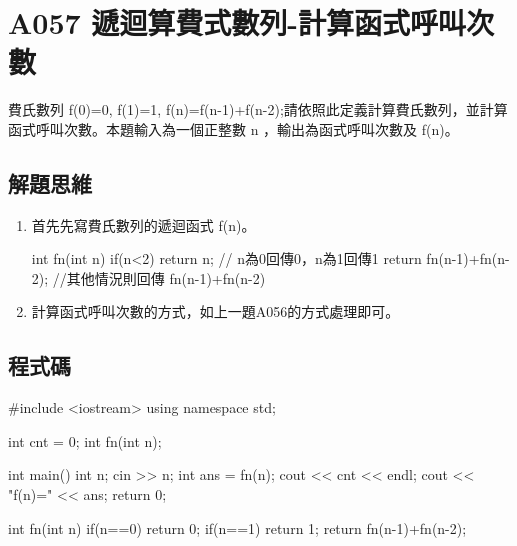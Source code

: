 \section{A057 遞迴算費式數列-計算函式呼叫次數}
費氏數列 f(0)=0, f(1)=1, f(n)=f(n-1)+f(n-2);請依照此定義計算費氏數列，並計算函式呼叫次數。本題輸入為一個正整數 n ，輸出為函式呼叫次數及 f(n)。

\subsection{解題思維}

\begin{enumerate}
	\item
	首先先寫費氏數列的遞迴函式 f(n)。
	\begin{inside}
	int fn(int n) {
		if(n<2) return n; // n為0回傳0，n為1回傳1
		return fn(n-1)+fn(n-2); //其他情況則回傳 fn(n-1)+fn(n-2)
	}	
	\end{inside}
	\item
	計算函式呼叫次數的方式，如上一題A056的方式處理即可。
\end{enumerate} 

\subsection{程式碼}
\begin{cppcode}
	#include <iostream>
	using namespace std;

	int cnt = 0;	
	int fn(int n);

	int main()
	{
		int n;
		cin >> n;
		int ans = fn(n);
		cout << cnt << endl;
		cout << "f(n)=" << ans;
		return 0;
	}
	
	int fn(int n) {
		if(n==0) return 0;
		if(n==1) return 1;
		return fn(n-1)+fn(n-2);
	}
\end{cppcode}
